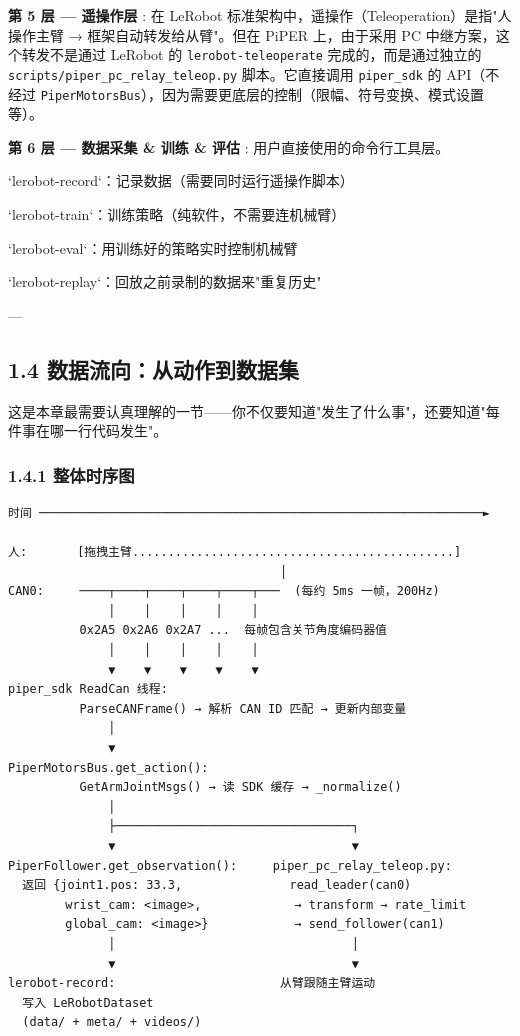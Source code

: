 \documentclass[UTF8,a4paper,11pt]{ctexart}
\begin{document}
\textbf{第 5 层 — 遥操作层}
: 在 LeRobot 标准架构中，遥操作（Teleoperation）是指"人操作主臂 → 框架自动转发给从臂"。但在 PiPER 上，由于采用 PC 中继方案，这个转发不是通过 LeRobot 的 \texttt{lerobot-teleoperate} 完成的，而是通过独立的 \texttt{scripts/piper_pc_relay_teleop.py} 脚本。它直接调用 \texttt{piper_sdk} 的 API（不经过 \texttt{PiperMotorsBus}），因为需要更底层的控制（限幅、符号变换、模式设置等）。

\textbf{第 6 层 — 数据采集 & 训练 & 评估}
: 用户直接使用的命令行工具层。
\item `lerobot-record`：记录数据（需要同时运行遥操作脚本）
\item `lerobot-train`：训练策略（纯软件，不需要连机械臂）
\item `lerobot-eval`：用训练好的策略实时控制机械臂
\item `lerobot-replay`：回放之前录制的数据来"重复历史"

---

\subsection{1.4 数据流向：从动作到数据集}

这是本章最需要认真理解的一节——你不仅要知道"发生了什么事"，还要知道"每件事在哪一行代码发生"。

\subsubsection{1.4.1 整体时序图}

\begin{lstlisting}[language=text]
时间 ──────────────────────────────────────────────────────────────►

人:       [拖拽主臂.............................................]
                                      │
CAN0:     ────┬────┬────┬────┬────┬───  (每约 5ms 一帧，200Hz)
              │    │    │    │    │
          0x2A5 0x2A6 0x2A7 ...  每帧包含关节角度编码器值
              │    │    │    │    │
              ▼    ▼    ▼    ▼    ▼
piper_sdk ReadCan 线程:
          ParseCANFrame() → 解析 CAN ID 匹配 → 更新内部变量
              │         
              ▼         
PiperMotorsBus.get_action():
          GetArmJointMsgs() → 读 SDK 缓存 → _normalize()
              │
              ├─────────────────────────────────┐
              ▼                                 ▼
PiperFollower.get_observation():     piper_pc_relay_teleop.py:
  返回 {joint1.pos: 33.3,               read_leader(can0)
        wrist_cam: <image>,             → transform → rate_limit
        global_cam: <image>}            → send_follower(can1)
              │                                 │
              ▼                                 ▼
lerobot-record:                       从臂跟随主臂运动
  写入 LeRobotDataset
  (data/ + meta/ + videos/)
\end{lstlisting}
\end{document}
